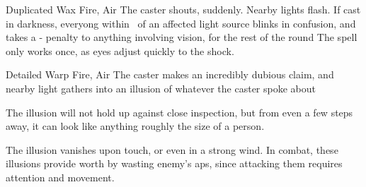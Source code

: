 \ifodd\value{diceNo}

  {Duplicated}%
  {Wax}%
  {Fire, Air}%
  {}%
  {The caster shouts, suddenly.
  Nearby lights flash.
  If cast in darkness, everyong within \spellRange\ of an affected light source blinks in confusion, and takes a - penalty to anything involving vision, for the rest of the round}%
  {The spell only works once, as eyes adjust quickly to the shock.}

\else

  {Detailed}%
  {Warp}%
  {Fire, Air}%
  {}%
  {The caster makes an incredibly dubious claim, and nearby light gathers into an illusion of whatever the caster spoke about}%
  {The illusion will not hold up against close inspection, but from even a few steps away, it can look like anything roughly the size of a person.

  The illusion vanishes upon touch, or even in a strong wind.
  In combat, these illusions provide worth by wasting enemy's \glspl{ap}, since attacking them requires attention and movement.}

\fi

